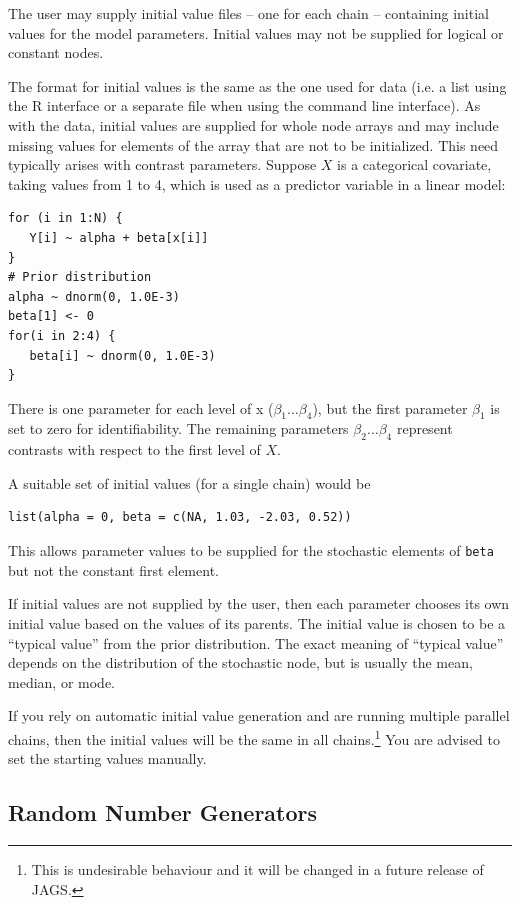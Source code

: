 \documentclass[11pt, a4paper, titlepage]{report}
\newcommand{\JAGS}{\textsf{JAGS}}
\begin{document}
The user may supply initial value files -- one for each chain --
containing initial values for the model parameters. Initial values may
not be supplied for logical or constant nodes.

The format for initial values is the same as the one used for data
(i.e. a list using the R interface or a separate file when using the
command line interface). As with the data, initial values are supplied
for whole node arrays and may include missing values for elements of
the array that are not to be initialized.  This need typically arises
with contrast parameters.  Suppose $X$ is a categorical covariate,
taking values from 1 to 4, which is used as a predictor variable in a
linear model:
\begin{verbatim}
for (i in 1:N) {
   Y[i] ~ alpha + beta[x[i]]
}
# Prior distribution
alpha ~ dnorm(0, 1.0E-3)
beta[1] <- 0
for(i in 2:4) {
   beta[i] ~ dnorm(0, 1.0E-3)
}
\end{verbatim}
There is one parameter for each level of x ($\beta_1 \ldots \beta_4$),
but the first parameter $\beta_1$ is set to zero for
identifiability. The remaining parameters $\beta_2 \ldots \beta_4$
represent contrasts with respect to the first level of $X$.

A suitable set of initial values (for a single chain) would be
\begin{verbatim}
list(alpha = 0, beta = c(NA, 1.03, -2.03, 0.52))
\end{verbatim}
This allows parameter values to be supplied for the stochastic
elements of \verb+beta+ but not the constant first element.

If initial values are not supplied by the user, then each parameter
chooses its own initial value based on the values of its parents.  The
initial value is chosen to be a ``typical value'' from the prior
distribution. The exact meaning of ``typical value'' depends on the
distribution of the stochastic node, but is usually the mean, median,
or mode.

If you rely on automatic initial value generation and are running
multiple parallel chains, then the initial values will be the same in
all chains.\footnote{This is undesirable behaviour and it will be changed in a
future release of \JAGS.} You are advised to set the starting values
manually.

\subsection{Random Number Generators}
\label{section:rngs}
\end{document}
